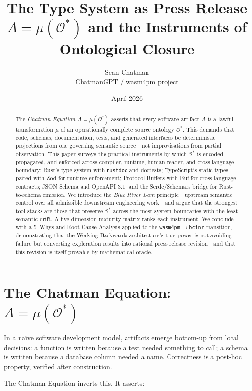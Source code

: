 \documentclass[11pt,a4paper]{article}
\title{\textbf{The Type System as Press Release}\\[6pt]
\large $A = \mu(\mathcal{O}^*)$ and the Instruments of Ontological Closure}
\author{Sean Chatman\\
\small ChatmanGPT / wasm4pm project}
\date{April 2026}
\theoremstyle{definition}
\begin{document}
\maketitle

\begin{abstract}
The \textit{Chatman Equation} $A = \mu(\mathcal{O}^*)$ asserts that every software artifact $A$ is a lawful transformation $\mu$ of an operationally complete source ontology $\mathcal{O}^*$. This demands that code, schemas, documentation, tests, and generated interfaces be deterministic projections from one governing semantic source---not improvisations from partial observation. This paper surveys the practical instruments by which $\mathcal{O}^*$ is encoded, propagated, and enforced across compiler, runtime, human reader, and cross-language boundary: Rust's type system with \texttt{rustdoc} and doctests; TypeScript's static types paired with Zod for runtime enforcement; Protocol Buffers with Buf for cross-language contracts; JSON Schema and OpenAPI 3.1; and the Serde/Schemars bridge for Rust-to-schema emission. We introduce the \textit{Blue River Dam} principle---upstream semantic control over all admissible downstream engineering work---and argue that the strongest tool stacks are those that preserve $\mathcal{O}^*$ across the most system boundaries with the least semantic drift. A five-dimension maturity matrix ranks each instrument. We conclude with a 5~Whys and Root Cause Analysis applied to the \texttt{wasm4pm}$\to$\texttt{bcinr} transition, demonstrating that the Working Backwards architecture's true power is not avoiding failure but converting exploration results into rational press release revision---and that this revision is itself provable by mathematical oracle.
\end{abstract}

\tableofcontents
\newpage

\section{The Chatman Equation: $A = \mu(\mathcal{O}^*)$}

In a naïve software development model, artifacts emerge bottom-up from local decisions: a function is written because a test needed something to call; a schema is written because a database column needed a name. Correctness is a post-hoc property, verified after construction.

The Chatman Equation inverts this. It asserts:
\end{document}
